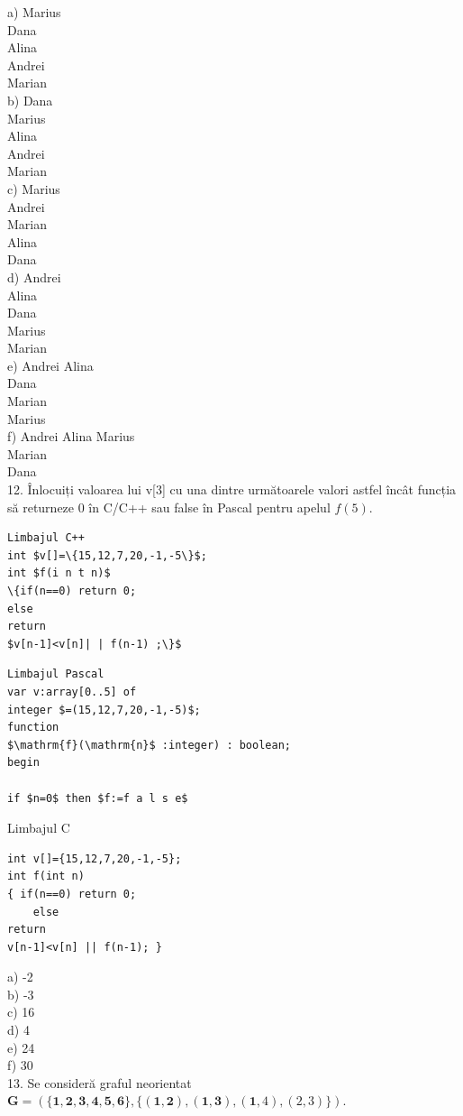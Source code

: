 \documentclass[10pt]{article}
\begin{document}
a) Marius\\
Dana\\
Alina\\
Andrei\\
Marian\\
b) Dana\\
Marius\\
Alina\\
Andrei\\
Marian\\
c) Marius\\
Andrei\\
Marian\\
Alina\\
Dana\\
d) Andrei\\
Alina\\
Dana\\
Marius\\
Marian\\
e) Andrei Alina\\
Dana\\
Marian\\
Marius\\
f) Andrei Alina Marius\\
Marian\\
Dana\\[0pt]
12. Înlocuiți valoarea lui v[3] cu una dintre următoarele valori astfel încât funcția să returneze 0 în C/C++ sau false în Pascal pentru apelul $f(5)$.

\begin{verbatim}
Limbajul C++
int $v[]=\{15,12,7,20,-1,-5\}$;
int $f(i n t n)$
\{if(n==0) return 0;
else
return
$v[n-1]<v[n]| | f(n-1) ;\}$
\end{verbatim}

\begin{verbatim}
Limbajul Pascal
var v:array[0..5] of
integer $=(15,12,7,20,-1,-5)$;
function
$\mathrm{f}(\mathrm{n}$ :integer) : boolean;
begin

if $n=0$ then $f:=f a l s e$
\end{verbatim}

Limbajul C

\begin{verbatim}
int v[]={15,12,7,20,-1,-5};
int f(int n)
{ if(n==0) return 0;
    else
return
v[n-1]<v[n] || f(n-1); }
\end{verbatim}

a) -2\\
b) -3\\
c) 16\\
d) 4\\
e) 24\\
f) 30\\
13. Se consideră graful neorientat $\mathbf{G}=(\{\mathbf{1 , 2 , 3 , 4 , 5 , 6 \}},\{(\mathbf{1 , 2}),(\mathbf{1}, \mathbf{3}),(\mathbf{1}, 4),(2,3)\})$.
\end{document}
